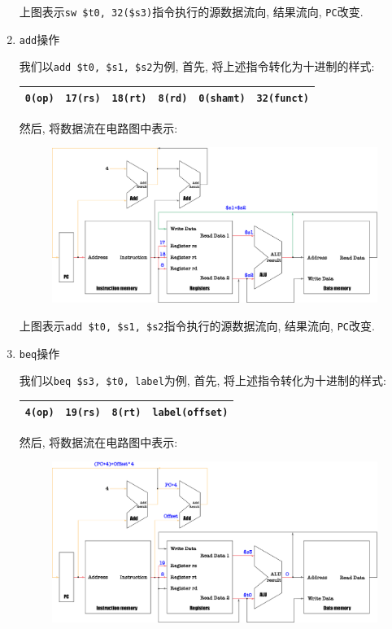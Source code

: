 \begin{enumerate}
\begin{figure}[H]
\end{figure}
上图表示\verb|sw $t0, 32($s3)|指令执行的\textcolor{myred}{源数据流向}, \textcolor{mygreen}{结果流向}, \textcolor{myyellow}{\texttt{PC}改变}.
\item \texttt{add}操作 \par
我们以\verb|add $t0, $s1, $s2|为例, 首先, 将上述指令转化为十进制的样式:
\begin{table}[H]
\centering
\begin{tabularx}{\textwidth}{|Z|Z|Z|Z|Z|Z|}
\hline
\verb|0(op)| & \verb|17(rs)| & \verb|18(rt)| & \verb|8(rd)| & \verb|0(shamt)| & \verb|32(funct)| \\
\hline
\end{tabularx}
\end{table}
然后, 将数据流在电路图中表示:
\begin{figure}[H]
\centering
\includegraphics[scale=.3]{img/figure28.pdf}
\end{figure}
上图表示\verb|add $t0, $s1, $s2|指令执行的\textcolor{myred}{源数据流向}, \textcolor{mygreen}{结果流向}, \textcolor{myyellow}{\texttt{PC}改变}.
\item \texttt{beq}操作 \par
我们以\verb|beq $s3, $t0, label|为例, 首先, 将上述指令转化为十进制的样式:
\begin{table}[H]
\centering
\begin{tabularx}{\textwidth}{|Z|Z|Z|Z|}
\hline
\verb|4(op)| & \verb|19(rs)| & \verb|8(rt)| & \verb|label(offset)| \\
\hline
\end{tabularx}
\end{table}
然后, 将数据流在电路图中表示:
\begin{figure}[H]
\centering
\includegraphics[scale=.3]{img/figure29.pdf}

\end{figure}
\end{enumerate}

